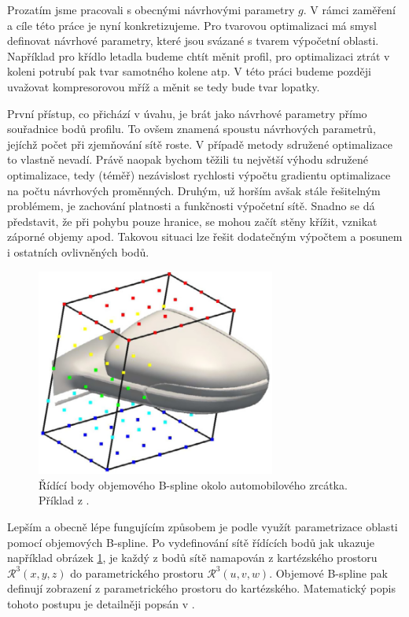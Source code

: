 Prozatím jsme pracovali s obecnými návrhovými parametry $ g $. V rámci zaměření a cíle této práce je nyní konkretizujeme. Pro tvarovou optimalizaci má smysl definovat návrhové parametry, které jsou svázané s tvarem výpočetní oblasti. Například pro křídlo letadla budeme chtít měnit profil, pro optimalizaci ztrát v koleni potrubí pak tvar samotného kolene atp. V této práci budeme později uvažovat kompresorovou mříž a měnit se tedy bude tvar lopatky.

První přístup, co přichází v úvahu, je brát jako návrhové parametry přímo souřadnice bodů profilu. To ovšem znamená spoustu návrhových parametrů, jejíchž počet při zjemňování sítě roste. V případě metody sdružené optimalizace to vlastně nevadí. Právě naopak bychom těžili tu největší výhodu sdružené optimalizace, tedy (téměř) nezávislost rychlosti výpočtu gradientu optimalizace na počtu návrhových proměnných. Druhým, už horším avšak stále řešitelným problémem, je zachování platnosti a funkčnosti výpočetní sítě. Snadno se dá představit, že při pohybu pouze hranice, se mohou začít stěny křížit, vznikat záporné objemy apod. Takovou situaci lze řešit dodatečným výpočtem a posunem i ostatních ovlivněných bodů. 

\begin{figure}[h]
	\includegraphics[width=0.7\textwidth]{./img/ridici_body.png}
	\caption[Řídící body objemového B-splive ve 3D]{Řídící body objemového B-spline okolo automobilového zrcátka. Příklad z \cite{papoutsis2015noise}.}
	\label{fig:zrcatko}
\end{figure}
Lepším a obecně lépe fungujícím způsobem je podle \cite{adjoint2020foam} využít parametrizace oblasti pomocí objemových B-spline.
Po vydefinování sítě řídících bodů jak ukazuje například obrázek \ref{fig:zrcatko}, je každý z bodů sítě namapován z kartézského prostoru $ \mathcal{R}^3(x,y,z) $ do parametrického prostoru $ \mathcal{R}^3(u,v,w) $.
Objemové B-spline pak definují zobrazení z parametrického prostoru do kartézského. 
Matematický popis tohoto postupu je detailněji popsán v \cite{papoutsis2015noise}. 

